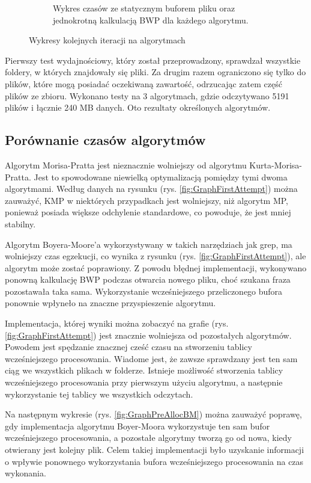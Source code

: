 \begin{figure}
\begin{subfigure}{0.7\textwidth}
    \caption{Wykres czasów ze statycznym buforem pliku oraz jednokrotną kalkulacją BWP dla każdego algorytmu.}
    \label{fig:GraphStaticPreallocAndFileBuffer}
\end{subfigure}
\caption{Wykresy kolejnych iteracji na algorytmach}
\label{fig:GraphsIterationComparison}
\end{figure}

Pierwszy test wydajnościowy, który został przeprowadzony, sprawdzał wszystkie 
foldery, w których znajdowały się pliki. Za drugim razem ograniczono się tylko
do plików, które mogą posiadać oczekiwaną zawartość, odrzucając zatem część 
plików ze zbioru. Wykonano testy na 3 algorytmach, gdzie odczytywano 5191 plików 
i łącznie 240 MB danych. Oto rezultaty określonych algorytmów.

\subsection{Porównanie czasów algorytmów}

Algorytm Morisa-Pratta jest nieznacznie wolniejszy od algorytmu 
Kurta-Morisa-Pratta. Jest to spowodowane niewielką optymalizacją pomiędzy tymi 
dwoma algorytmami. Według danych na rysunku (rys. \ref{fig:GraphFirstAttempt}) można 
zauważyć, KMP w niektórych przypadkach jest wolniejszy, niż algorytm MP, 
ponieważ posiada większe odchylenie standardowe, co powoduje, że jest mniej
stabilny. 

Algorytm Boyera-Moore'a wykorzystywany w takich narzędziach jak grep, ma 
wolniejszy czas egzekucji, co wynika z rysunku (rys. \ref{fig:GraphFirstAttempt}), ale 
algorytm może zostać poprawiony. Z powodu błędnej implementacji, wykonywano
ponowną kalkulację BWP podczas otwarcia nowego pliku, choć szukana fraza pozostawała
taka sama. Wykorzystanie wcześniejszego przeliczonego bufora ponownie wpłyneło na znaczne
przyspieszenie algorytmu.

Implementacja, której wyniki można zobaczyć na grafie (rys. \ref{fig:GraphFirstAttempt}) jest
znacznie wolniejsza od pozostałych algorytmów. Powodem jest spędzanie znacznej
cześć czasu na stworzeniu tablicy wcześniejszego procesowania. Wiadome jest, że zawsze 
sprawdzany jest ten sam ciąg we wszystkich plikach w folderze. Istnieje możliwość 
stworzenia tablicy wcześniejszego procesowania przy pierwszym użyciu algorytmu, a następnie
wykorzystanie tej tablicy we wszystkich odczytach.

Na następnym wykresie (rys. \ref{fig:GraphPreAllocBM}) można zauważyć poprawę, gdy
implementacja algorytmu Boyer-Moora wykorzystuje ten sam bufor wcześniejszego procesowania, a
pozostałe algorytmy tworzą go od nowa, kiedy otwierany jest kolejny plik. Celem 
takiej implementacji było uzyskanie informacji o wpływie ponownego wykorzystania
bufora wcześniejszego procesowania na czas wykonania. 

